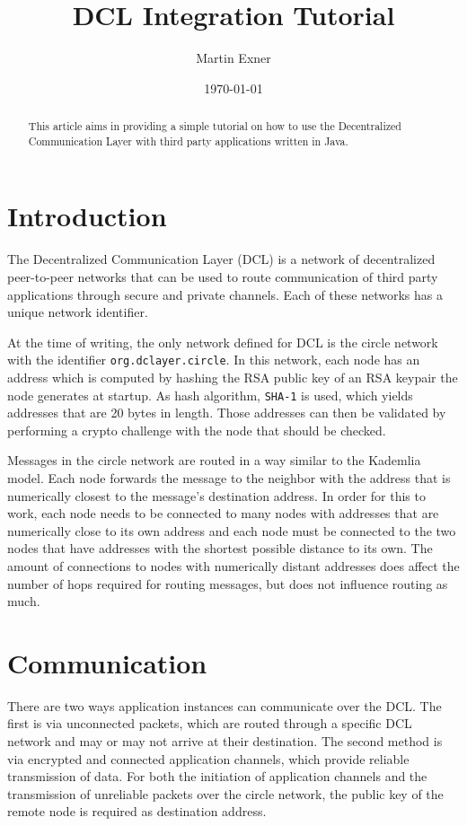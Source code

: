 \documentclass[a4paper,twocolumn]{article}
\title{DCL Integration Tutorial}
\author{Martin Exner}
\date{\today}
\newcommand{\code}[1]{\texttt{#1}}
\begin{document}
\maketitle

\begin{abstract}
This article aims in providing a simple tutorial on how to use the
Decentralized Communication Layer with third party applications written
in Java.
\end{abstract}

\section*{Introduction}
The Decentralized Communication Layer (DCL) is a network of decentralized
peer-to-peer networks that can be used to route communication of third party
applications through secure and private channels. Each of these networks has a
unique network identifier.

At the time of writing, the only network defined for DCL is the circle network
with the identifier \code{org.dclayer.circle}. In this network, each node has
an address which is computed by hashing the RSA public key of an RSA keypair
the node generates at startup. As hash algorithm, \code{SHA-1} is used, which
yields addresses that are 20 bytes in length. Those addresses can then be
validated by performing a crypto challenge with the node that should be checked.

Messages in the circle network are routed in a way similar to the Kademlia
model. Each node forwards the message to the neighbor with the address that is
numerically closest to the message's destination address. In order for this to
work, each node needs to be connected to many nodes with addresses that are
numerically close to its own address and each node must be connected to the two
nodes that have addresses with the shortest possible distance to its own. The
amount of connections to nodes with numerically distant addresses does affect
the number of hops required for routing messages, but does not influence routing
as much.

\section*{Communication}
There are two ways application instances can communicate over the DCL. The first
is via unconnected packets, which are routed through a specific DCL network and
may or may not arrive at their destination. The second method is via encrypted
and connected application channels, which provide reliable transmission of data.
For both the initiation of application channels and the transmission of
unreliable packets over the circle network, the public key of the remote node is
required as destination address.
\end{document}
